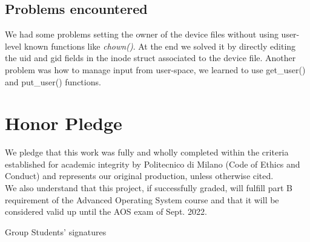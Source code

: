 \documentclass[10pt,a4]{article}
\begin{document}
\subsection{Problems encountered}
We had some problems setting the owner of the device files without using user-level known functions like \textit{chown()}. At the end we solved it by directly editing the uid and gid fields in the inode struct associated to the device file.
Another problem was how to manage input from user-space, we learned to use get\_user() and put\_user() functions.

\section{Honor Pledge}

We pledge that this work was fully and wholly completed within the criteria
established for academic integrity by Politecnico di Milano (Code of Ethics and
Conduct) and represents our original production, unless otherwise cited.\\
We also understand that this project, if successfully graded, will fulfill part B requirement of the
Advanced Operating System course and that it will be considered valid up until
the AOS exam of Sept. 2022. 

\begin{flushright}
Group Students' signatures
\end{flushright}
\end{document}
